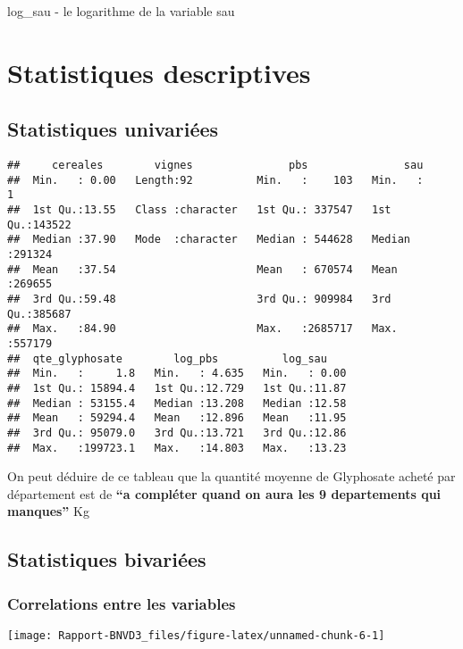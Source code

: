 \documentclass[
]{article}
\begin{document}
log\_sau - le logarithme de la variable sau

\section{Statistiques descriptives}\label{statistiques-descriptives}

\subsection{Statistiques univariées}\label{statistiques-univariuxe9es}

\begin{verbatim}
##     cereales        vignes               pbs               sau        
##  Min.   : 0.00   Length:92          Min.   :    103   Min.   :     1  
##  1st Qu.:13.55   Class :character   1st Qu.: 337547   1st Qu.:143522  
##  Median :37.90   Mode  :character   Median : 544628   Median :291324  
##  Mean   :37.54                      Mean   : 670574   Mean   :269655  
##  3rd Qu.:59.48                      3rd Qu.: 909984   3rd Qu.:385687  
##  Max.   :84.90                      Max.   :2685717   Max.   :557179  
##  qte_glyphosate        log_pbs          log_sau     
##  Min.   :     1.8   Min.   : 4.635   Min.   : 0.00  
##  1st Qu.: 15894.4   1st Qu.:12.729   1st Qu.:11.87  
##  Median : 53155.4   Median :13.208   Median :12.58  
##  Mean   : 59294.4   Mean   :12.896   Mean   :11.95  
##  3rd Qu.: 95079.0   3rd Qu.:13.721   3rd Qu.:12.86  
##  Max.   :199723.1   Max.   :14.803   Max.   :13.23
\end{verbatim}

On peut déduire de ce tableau que la quantité moyenne de Glyphosate
acheté par département est de \textbf{``a compléter quand on aura les 9
departements qui manques''} Kg

\subsection{Statistiques bivariées}\label{statistiques-bivariuxe9es}

\subsubsection{Correlations entre les
variables}\label{correlations-entre-les-variables}

\begin{center}\texttt{[image: Rapport-BNVD3\_files/figure-latex/unnamed-chunk-6-1]} \end{center}
\end{document}
